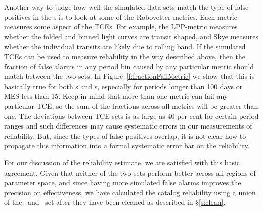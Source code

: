 Another way to judge how well the simulated data sets match the type of false positives in the \opstce s is to look at some of the Robovetter metrics.  Each metric measures some aspect of the TCEs. For example, the LPP-metric measures whether the folded and binned light curves are transit shaped, and Skye measures whether the individual transits are likely due to rolling band.  If the simulated TCEs can be used to measure reliability in the way described above, then the fraction of false alarms in any period bin caused by any particular metric should match between the two sets.  In Figure~\ref{f:fractionFailMetric} we show that this is basically true for both \invtce s and \scrtce s, especially for periods longer than 100 days or MES less than 15.  Keep in mind that more than one metric can fail any particular TCE, so the sum of the fractions across all metrics will be greater than one.  The deviations between TCE sets is as large as 40 per cent for certain period ranges and such differences may cause systematic errors in our measurements of reliability.  But, since the types of false positives overlap, it is not clear how to propagate this information into a formal systematic error bar on the reliability.  

For our discussion of the reliability estimate, we are satisfied with this basic agreement. Given that neither of the two sets perform better across all regions of parameter space, and since having more simulated false alarms improves the precision on effectiveness,  we have calculated the catalog reliability using a union of the \scrtce\ and \invtce\ set after they have been cleaned as described in \S\ref{s:clean}.  



